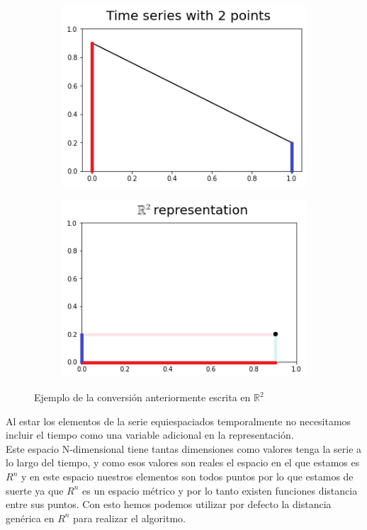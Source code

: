 \documentclass[12pt,a4paper]{article}
\begin{document}
\begin{figure}[H]
\centering
\begin{subfigure}{.5\textwidth}
  \centering
  \includegraphics[width=.9\linewidth]{Ejemplo R2 (1)}
  \label{fig:sub1}
\end{subfigure}%
\begin{subfigure}{.5\textwidth}
  \centering
  \includegraphics[width=.9\linewidth]{Ejemplo R2 (2)}
  \label{fig:sub2}
\end{subfigure}
\caption{Ejemplo de la conversión anteriormente escrita en $\mathbb{R}^2$}
\label{fig:test}
\end{figure}
Al estar los elementos de la serie equiespaciados temporalmente no necesitamos incluir el tiempo como una variable adicional en la representación.\\
			Este espacio N-dimensional tiene tantas dimensiones como valores tenga la serie a lo largo del tiempo, y como esos valores son reales el espacio en el que estamos es $R^n$ y en este espacio nuestros elementos son todos puntos por lo que estamos de suerte ya que $R^n$ es un espacio métrico y por lo tanto existen funciones distancia entre sus puntos. Con esto hemos podemos utilizar por defecto la distancia genérica en $R^n$ para realizar el algoritmo.\\
			
\end{document}
